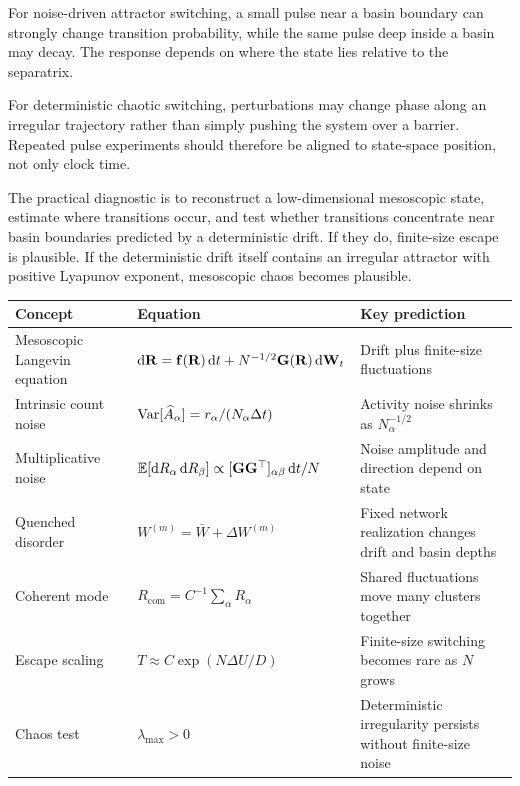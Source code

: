 For noise-driven attractor switching, a small pulse near a basin boundary can strongly change transition probability, while the same pulse deep inside a basin may decay. The response depends on where the state lies relative to the separatrix.

For deterministic chaotic switching, perturbations may change phase along an irregular trajectory rather than simply pushing the system over a barrier. Repeated pulse experiments should therefore be aligned to state-space position, not only clock time.

The practical diagnostic is to reconstruct a low-dimensional mesoscopic state, estimate where transitions occur, and test whether transitions concentrate near basin boundaries predicted by a deterministic drift. If they do, finite-size escape is plausible. If the deterministic drift itself contains an irregular attractor with positive Lyapunov exponent, mesoscopic chaos becomes plausible.

\begin{chaptersummary}

\begin{center}
\renewcommand{\arraystretch}{1.55}
\begin{tabularx}{\textwidth}{@{}l X X@{}}
  \toprule
  \textbf{Concept} & \textbf{Equation} & \textbf{Key prediction} \\
  \midrule
  Mesoscopic Langevin equation &
  $\mathop{}\!\mathrm{d}\mathbf{R}=\mathbf{f}(\mathbf{R})\mathop{}\!\mathrm{d} t+N^{-1/2}\mathbf{G}(\mathbf{R})\mathop{}\!\mathrm{d}\mathbf{W}_t$ &
  Drift plus finite-size fluctuations \\
  Intrinsic count noise &
  $\operatorname{Var}[\widehat A_\alpha]=r_\alpha/(N_\alpha\Delta t)$ &
  Activity noise shrinks as $N_\alpha^{-1/2}$ \\
  Multiplicative noise &
  $\mathbb{E}[\mathop{}\!\mathrm{d} R_\alpha\mathop{}\!\mathrm{d} R_\beta]\propto [\mathbf{G}\mathbf{G}^\top]_{\alpha\beta}\mathop{}\!\mathrm{d} t/N$ &
  Noise amplitude and direction depend on state \\
  Quenched disorder &
  $W^{(m)}=\bar W+\Delta W^{(m)}$ &
  Fixed network realization changes drift and basin depths \\
  Coherent mode &
  $R_{\mathrm{com}}=C^{-1}\sum_\alpha R_\alpha$ &
  Shared fluctuations move many clusters together \\
  Escape scaling &
  $T\approx C\exp(N\Delta U/D)$ &
  Finite-size switching becomes rare as $N$ grows \\
  Chaos test &
  $\lambda_{\max}>0$ &
  Deterministic irregularity persists without finite-size noise \\
  \bottomrule
\end{tabularx}
\end{center}

\end{chaptersummary}

